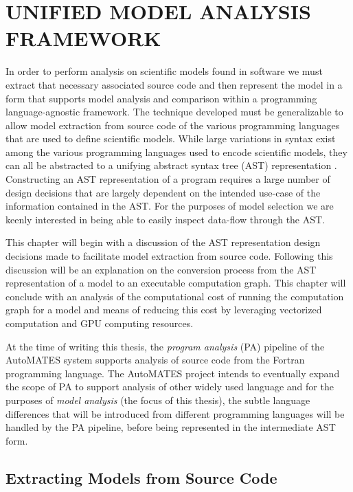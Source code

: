 \chapter{UNIFIED MODEL ANALYSIS FRAMEWORK\label{chapter:umaf}}
In order to perform analysis on scientific models found in software we must  extract that necessary associated source code and then represent the model in a form that supports model analysis and comparison within a programming language-agnostic framework.
The technique developed must be generalizable to allow model extraction from source code of the various programming languages that are used to define scientific models.
While large variations in syntax exist among the various programming languages used to encode scientific models, they can all be abstracted to a unifying abstract syntax tree (AST) representation \citep{aho1986dragonBook}.
Constructing an AST representation of a program requires a large number of design decisions that are largely dependent on the intended use-case of the information contained in the AST.
For the purposes of model selection we are keenly interested in being able to easily inspect data-flow through the AST.

This chapter will begin with a discussion of the AST representation design decisions made to facilitate model extraction from source code.
Following this discussion will be an explanation on the conversion process from the AST representation of a model to an executable computation graph.
This chapter will conclude with an analysis of the computational cost of running the computation graph for a model and means of reducing this cost by leveraging vectorized computation and GPU computing resources.

At the time of writing this thesis, the \emph{program analysis} (PA) pipeline of the AutoMATES system supports analysis of source code from the Fortran programming language.
The AutoMATES project intends to eventually expand the scope of PA to support analysis of other widely used language and for the purposes of \emph{model analysis} (the focus of this thesis), the subtle language differences that will be introduced from different programming languages will be handled by the PA pipeline, before being represented in the intermediate AST form.

\section{Extracting Models from Source Code\label{sec:model_extraction}}

